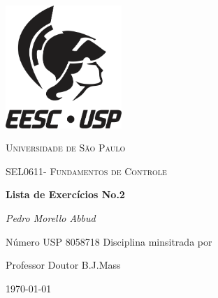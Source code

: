 \documentclass[12pt,a4paper]{article}
\begin{document}
\begin{titlepage}
	\centering
  \includegraphics[width=0.33\textwidth]{usp}\par\vspace{1cm}
  {\scshape\LARGE Universidade de São Paulo\par}
	\vspace{1cm}
  {\scshape\Large SEL0611- Fundamentos de Controle\par}
	\vspace{1.5cm}
  {\huge\bfseries Lista de Exercícios No.2\par}
	\vspace{2cm}
  {\Large\itshape Pedro Morello Abbud \par}
  \vspace{1cm}
  Número USP 8058718
	\vfill
  Disciplina minsitrada por\par
  Professor Doutor B.J.Mass

	\vfill 
	{\large \today\par}
\end{titlepage}
\newpage
\end{document}
